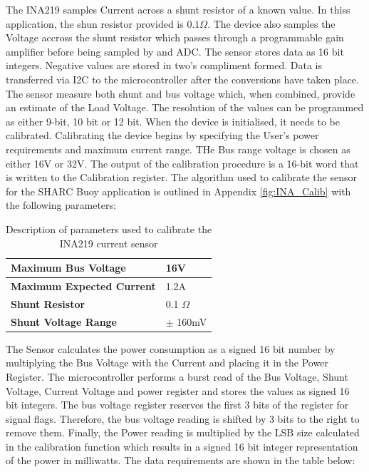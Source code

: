 The INA219 samples Current across a shunt resistor of a known value. In thiss application, the shun resistor provided is $0.1\Omega$. The device also samples the Voltage accross the shunt resistor which passes through a programmable gain amplifier before being sampled by and ADC. The sensor stores data as 16 bit integers. Negative values are stored in two's compliment formed. Data is transferred via I2C to the microcontroller after the conversions have taken place. The sensor measure both shunt and bus voltage which, when combined, provide an estimate of the Load Voltage. The resolution of the values can be programmed as either 9-bit, 10 bit or 12 bit. When the device is initialised, it needs to be calibrated. Calibrating the device begins by specifying the User's power requirements and maximum current range. THe Bus range voltage is chosen as either 16V or 32V. The output of the calibration procedure is a 16-bit word that is written to the Calibration register. The algorithm used to calibrate the sensor for the SHARC Buoy application is outlined in Appendix \ref{fig:INA_Calib} with the following parameters:
\begin{table}[H]
	\centering
	\caption{ Description of parameters used to calibrate the INA219 current sensor}
	\begin{tabular}{|l | l|}
		\hline
		\textbf{Maximum Bus Voltage}& 16V \\
		\hline
		\textbf{Maximum Expected Current} & 1.2A \\
		\hline
		\textbf{Shunt Resistor} & 0.1 $\Omega$ \\
		\hline
		\textbf{Shunt Voltage Range} & $\pm$ 160mV\\
		\hline
	\end{tabular}
	
	\label{tab:INA_Calib}
\end{table}

The Sensor calculates the power consumption as a signed 16 bit number by multiplying the Bus Voltage with the Current and placing it in the Power Register. The microcontroller performs a burst read of the Bus Voltage, Shunt Voltage, Current Voltage and power register and stores the values as signed 16 bit integers. The bus voltage register reserves the first 3 bits of the register for signal flags. Therefore, the bus voltage reading is shifted by 3 bits to the right to remove them. Finally, the Power reading is multiplied by the LSB size calculated in the calibration function which results in a signed 16 bit integer representation of the power in milliwatts. The data requirements are shown in the table below:


